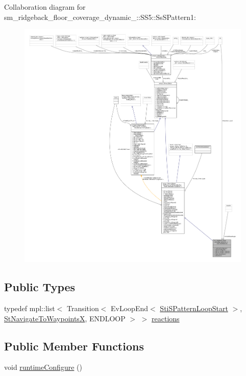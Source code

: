 Collaboration diagram for sm\+\_\+ridgeback\+\_\+floor\+\_\+coverage\+\_\+dynamic\+\_\+:\+:S\+S5\+:\+:Ss\+S\+Pattern1\+:
\nopagebreak
\begin{figure}[H]
\begin{center}
\leavevmode
\includegraphics[width=350pt]{structsm__ridgeback__floor__coverage__dynamic__1_1_1SS5_1_1SsSPattern1__coll__graph}
\end{center}
\end{figure}
\subsection*{Public Types}
\begin{DoxyCompactItemize}
\item 
typedef mpl\+::list$<$ Transition$<$ Ev\+Loop\+End$<$ \hyperlink{structsm__ridgeback__floor__coverage__dynamic__1_1_1s__pattern__states_1_1StiSPatternLoopStart}{Sti\+S\+Pattern\+Loop\+Start} $>$, \hyperlink{structsm__ridgeback__floor__coverage__dynamic__1_1_1StNavigateToWaypointsX}{St\+Navigate\+To\+WaypointsX}, E\+N\+D\+L\+O\+OP $>$ $>$ \hyperlink{structsm__ridgeback__floor__coverage__dynamic__1_1_1SS5_1_1SsSPattern1_a1abcc276d1edf0a0e6eaa756a220a873}{reactions}
\end{DoxyCompactItemize}
\subsection*{Public Member Functions}
\begin{DoxyCompactItemize}
\item 
void \hyperlink{structsm__ridgeback__floor__coverage__dynamic__1_1_1SS5_1_1SsSPattern1_a0a1d3e9c9499bddc49212ccaa0f91550}{runtime\+Configure} ()
\end{DoxyCompactItemize}
